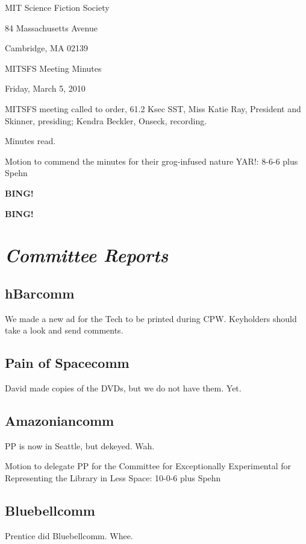 \documentclass[10pt]{article}
\newcommand{\bing}{{\bf BING!} }
\newcommand{\goto}[1]{\bing \vskip 12pt \section*{{\em{#1}}}}
\newcommand{\ps}{ plus Spehn\xspace}
\newcommand{\skinner}{Miss Katie Ray, President and Skinner}
\newcommand{\onseck}{Kendra Beckler, Onseck}
\newcommand{\meetingdate}{Friday, March 5, 2010}
\begin{document}
\begin{center}

MIT Science Fiction Society

84 Massachusetts Avenue

Cambridge, MA 02139

\vspace{12pt}

MITSFS Meeting Minutes

\meetingdate

\end{center}

\vspace{18pt}

\setlength{\parskip}{6pt}

\noindent
MITSFS meeting called to order, 61.2 Ksec SST,
\skinner, presiding; \onseck, recording.

Minutes read.

Motion to commend the minutes for their grog-infused nature YAR!: 8-6-6\ps

\bing

\goto{Committee Reports}

\subsection*{hBarcomm}

We made a new ad for the Tech to be printed during CPW.  Keyholders should take a look and send comments.

\subsection*{Pain of Spacecomm}

David made copies of the DVDs, but we do not have them.  Yet.

\subsection*{Amazoniancomm}

PP is now in Seattle, but dekeyed.  Wah.

Motion to delegate PP for the Committee for Exceptionally Experimental for Representing the Library in Less Space: 10-0-6 \ps

\subsection*{Bluebellcomm}

Prentice did Bluebellcomm.  Whee.
\end{document}
